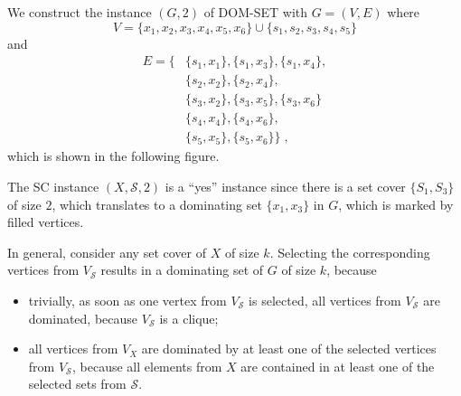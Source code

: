 \documentclass{exercise}
\begin{document}
\begin{solution}
    We construct the instance $(G,2)$ of DOM-SET with $G=(V,E)$ where
    \[ V = \{x_1,x_2,x_3,x_4,x_5,x_6\} \cup \{s_1,s_2,s_3,s_4,s_5\} \]
    and
    \begin{align*}
      E = \big\{ {}& \{s_1,x_1\}, \{s_1,x_3\}, \{s_1,x_4\}, \\
                   & \{s_2,x_2\}, \{s_2,x_4\},\\
                   & \{s_3,x_2\}, \{s_3,x_5\}, \{s_3,x_6\}\\
                   & \{s_4,x_4\}, \{s_4,x_6\},\\
                   & \{s_5,x_5\}, \{s_5,x_6\}\big\}\;,
    \end{align*}
    which is shown in the following figure.
    \begin{center}
    \end{center}

    The SC instance $(X,\mathcal{S},2)$ is a ``yes'' instance since there is a set cover
    $\{S_1,S_3\}$ of size $2$, which translates to a dominating set $\{x_1,x_3\}$ in $G$,
    which is marked by filled vertices.

    In general, consider any set cover of $X$ of size $k$.  Selecting
    the corresponding vertices from $V_{\mathcal{S}}$ results in a dominating set
    of $G$ of size $k$, because
    \begin{itemize}
      \item trivially, as soon as one vertex from $V_{\mathcal{S}}$ is selected, all vertices
        from $V_{\mathcal{S}}$ are dominated, because $V_{\mathcal{S}}$ is a clique;
      \item all vertices from $V_X$ are dominated by at least one of the selected vertices
        from $V_{\mathcal{S}}$, because all elements from $X$ are contained in at least one
        of the selected sets from $\mathcal{S}$.
    \end{itemize}


\end{solution}
\end{document}
